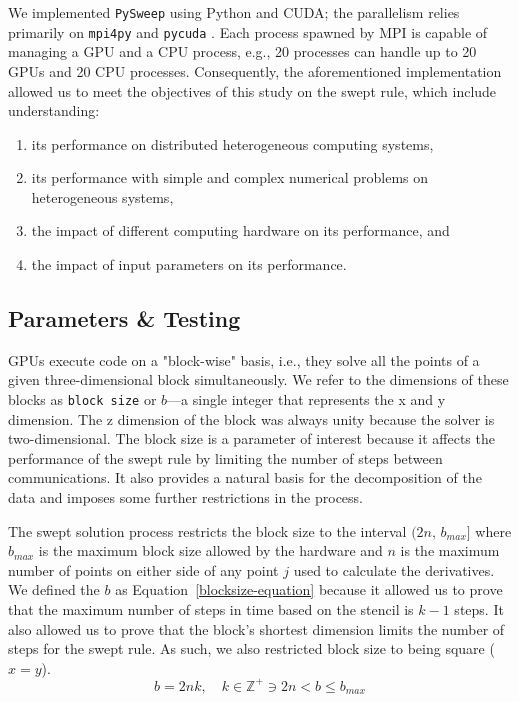 \documentclass[preprints,article,accept,moreauthors,pdftex]{Definitions/mdpi}
\def\pysweep{\texttt{PySweep}}
\begin{document}
\par
We implemented \pysweep{} using Python and CUDA; the parallelism relies primarily on \texttt{mpi4py} \cite{DalcinMPIPython} and \texttt{pycuda} \cite{KlocknerPyCUDAGeneration}. Each process spawned by MPI is capable of managing a GPU and a CPU process, e.g., 20 processes can handle up to 20 GPUs and 20 CPU processes. Consequently, the aforementioned implementation allowed us to meet the objectives of this study on the swept rule, which include understanding:
\begin{enumerate}
    \item its performance on distributed heterogeneous computing systems,
    \item its performance with simple and complex numerical problems on heterogeneous systems,
    \item the impact of different computing hardware on its performance, and
    \item the impact of input parameters on its performance.
\end{enumerate}

\subsection{Parameters \& Testing}
\label{parameters-section}

GPUs execute code on a "block-wise" basis, i.e., they solve all the points of a given three-dimensional block simultaneously. We refer to the dimensions of these blocks as \texttt{block size} or $b$---a single integer that represents the x and y dimension. The z dimension of the block was always unity because the solver is two-dimensional. The block size is a parameter of interest because it affects the performance of the swept rule by limiting the number of steps between communications. It also provides a natural basis for the decomposition of the data and imposes some further restrictions in the process.

\par 
The swept solution process restricts the block size to the interval $(2n,\,b_{max}]$ where $b_{max}$ is the maximum block size allowed by the hardware and $n$ is the maximum number of points on either side of any point $j$ used to calculate the derivatives. We defined the $b$ as Equation~\ref{blocksize-equation} because it allowed us to prove that the maximum number of steps in time based on the stencil is $k-1$ steps. It also allowed us to prove that the block's shortest dimension limits the number of steps for the swept rule. As such, we also restricted block size to being square ($x=y$).
\begin{equation}
    \label{blocksize-equation}
    b  = 2nk,\quad k\in\mathbb{Z}^{+}\ni 2n < b \leq b_{max}
\end{equation}
\end{document}
